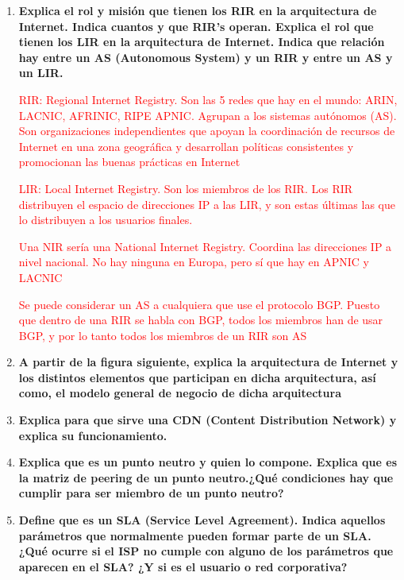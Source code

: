\documentclass[a4paper,10pt]{article}
\newcommand{\red}[1]{\textcolor{red}{#1}}
\begin{document}
\begin{enumerate}
  \item \textbf{Explica el rol y misión que tienen los RIR en la arquitectura de Internet. Indica cuantos y
que RIR’s operan. Explica el rol que tienen los LIR en la arquitectura de Internet. Indica que
relación hay entre un AS (Autonomous System) y un RIR y entre un AS y un LIR.}

\red{
RIR: Regional Internet Registry. Son las 5 redes que hay en el mundo: ARIN, LACNIC, AFRINIC, RIPE APNIC. Agrupan a los sistemas autónomos (AS). Son organizaciones independientes que apoyan la coordinación de recursos de Internet en una zona geográfica y desarrollan políticas consistentes y promocionan las buenas prácticas en Internet
}

\red{
LIR: Local Internet Registry. Son los miembros de los RIR. Los RIR distribuyen el espacio de direcciones IP a las LIR, y son estas últimas las que lo distribuyen a los usuarios finales.
}

\red{
Una NIR sería una National Internet Registry. Coordina las direcciones IP a nivel nacional. No hay ninguna en Europa, pero sí que hay en APNIC y LACNIC
}

\red{
Se puede considerar un AS a cualquiera que use el protocolo BGP. Puesto que dentro de una RIR se habla con BGP, todos los miembros han de usar BGP, y por lo tanto todos los miembros de un RIR son AS
}




  \item \textbf{A partir de la figura siguiente, explica la arquitectura de Internet y los distintos elementos
que participan en dicha arquitectura, así como, el modelo general de negocio de dicha arquitectura}

  \item \textbf{Explica para que sirve una CDN (Content Distribution Network) y explica su
funcionamiento.}

  \item \textbf{Explica que es un punto neutro y quien lo compone. Explica que es la matriz de peering
de un punto neutro.¿Qué condiciones hay que cumplir para ser miembro de un punto neutro?}

  \item \textbf{Define que es un SLA (Service Level Agreement). Indica aquellos parámetros que
normalmente pueden formar parte de un SLA. ¿Qué ocurre si el ISP no cumple con alguno de los
parámetros que aparecen en el SLA? ¿Y si es el usuario o red corporativa?}


\end{enumerate}
\end{document}
